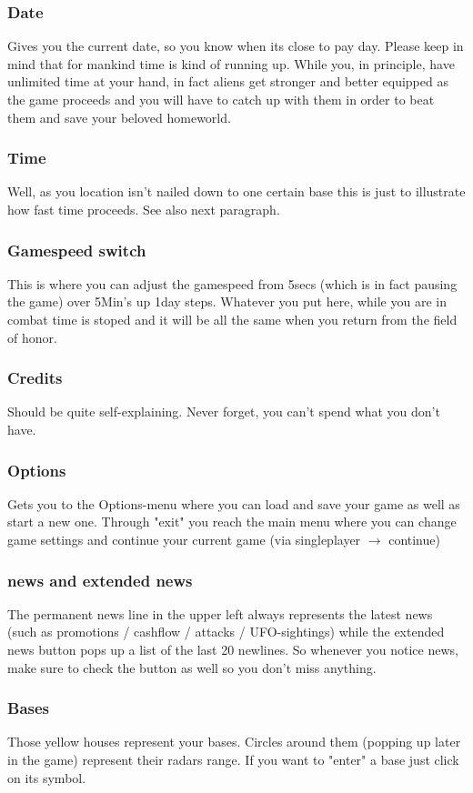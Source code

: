\subsubsection{Date}
Gives you the current date, so you know when its close to pay day. Please keep in mind that for mankind time is kind of running up. While you, in principle, have unlimited time at your hand, in fact aliens get stronger and better equipped as the game proceeds and you will have to catch up with them in order to beat them and save your beloved homeworld.
\subsubsection{Time}
Well, as you location isn't nailed down to one certain base this is just to illustrate how fast time proceeds. See also next paragraph.
\subsubsection{Gamespeed switch}
This is where you can adjust the gamespeed from 5secs (which is in fact pausing the game) over 5Min's up 1day steps. Whatever you put here, while you are in combat time is stoped and it will be all the same when you return from the field of honor.
\subsubsection{Credits}
Should be quite self-explaining. Never forget, you can't spend what you don't have.
\subsubsection{Options}
Gets you to the Options-menu where you can load and save your game as well as start a new one.
Through "exit" you reach the main menu where you can change game settings and continue your current game (via singleplayer $\rightarrow$ continue)
\subsubsection{news and extended news}
The permanent news line in the upper left always represents the latest news (such as promotions / cashflow / attacks / UFO-sightings) while the extended news button pops up a list of the last 20 newlines.
So whenever you notice news, make sure to check the button as well so you don't miss anything. 
\subsubsection{Bases}
Those yellow houses represent your bases. Circles around them (popping up later in the game) represent their radars range.  If you want to "enter" a base just click on its symbol.
